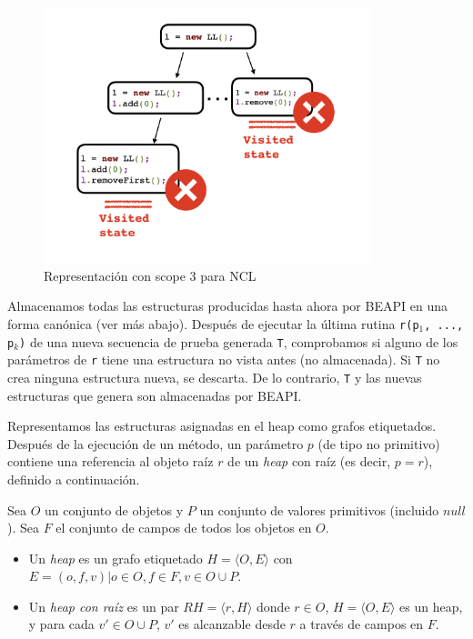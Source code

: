 \begin{figure}[H]
    \centering
    \includegraphics[width=0.85\textwidth]{images/stateMatching.jpg}
    \caption{Representación con scope 3 para NCL}
    \label{fig:stateMatching}
\end{figure}

Almacenamos todas las estructuras producidas hasta ahora por \textsf{BEAPI} en una forma canónica (ver más abajo). Después de ejecutar la última rutina \texttt{r(p$_1$, ..., p$_k$)} de una nueva secuencia de prueba generada \texttt{T}, comprobamos si alguno de los parámetros de \texttt{r} tiene una estructura no vista antes (no almacenada). Si \texttt{T} no crea ninguna estructura nueva, se descarta. De lo contrario, \texttt{T} y las nuevas estructuras que genera son almacenadas por \textsf{BEAPI}.

Representamos las estructuras asignadas en el heap como grafos etiquetados. Después de la ejecución de un método, un parámetro $p$ (de tipo no primitivo) contiene una referencia al objeto raíz $r$ de un \emph{heap} con raíz (es decir, $p=r$), definido a continuación.

\begin{definition}
Sea $O$ un conjunto de objetos y $P$ un conjunto de valores primitivos (incluido $null$). Sea $F$ el conjunto de campos de todos los objetos en $O$.
\begin{itemize}
\item Un \emph{heap} es un grafo etiquetado $H = \langle O, E\rangle$ con $E = {(o, f, v) | o \in O, f \in F, v \in O \cup P}$.
\item Un \emph{heap con raíz} es un par $RH = \langle r, H \rangle$ donde $r \in O$, $H = \langle O, E\rangle$ es un heap, y para cada $v' \in O \cup P$, $v'$ es alcanzable desde $r$ a través de campos en $F$.
\end{itemize}
\end{definition}

